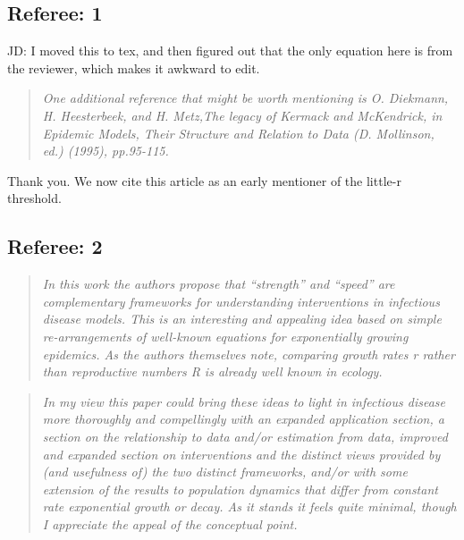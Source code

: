 \newcommand{\RR}{\ensuremath{{\mathcal R}}}
\newcommand{\Rhat}{\ensuremath{{\hat\RR}}}
\newcommand{\rr}{\ensuremath{{r}}}

\hypertarget{referee-1}{%
\subsection{Referee: 1}\label{referee-1}}

JD: I moved this to tex, and then figured out that the only equation here is from the reviewer, which makes it awkward to edit.

\begin{quote}\sl
One additional reference that might be worth mentioning is O. Diekmann,
H. Heesterbeek, and H. Metz,The legacy of Kermack and McKendrick, in
Epidemic Models, Their Structure and Relation to Data (D. Mollinson,
ed.) (1995), pp.95-115.
\end{quote}

Thank you. We now cite this article as an early mentioner of the
little-r threshold.

\hypertarget{referee-2}{%
\subsection{Referee: 2}\label{referee-2}}

\begin{quote}\sl
In this work the authors propose that ``strength'' and ``speed'' are
complementary frameworks for understanding interventions in infectious
disease models. This is an interesting and appealing idea based on
simple re-arrangements of well-known equations for exponentially growing
epidemics. As the authors themselves note, comparing growth rates r
rather than reproductive numbers R is already well known in ecology.
\end{quote}

\begin{quote}\sl
In my view this paper could bring these ideas to light in infectious
disease more thoroughly and compellingly with an expanded application
section, a section on the relationship to data and/or estimation from
data, improved and expanded section on interventions and the distinct
views provided by (and usefulness of) the two distinct frameworks,
and/or with some extension of the results to population dynamics that
differ from constant rate exponential growth or decay. As it stands it
feels quite minimal, though I appreciate the appeal of the conceptual
point.
\end{quote}

